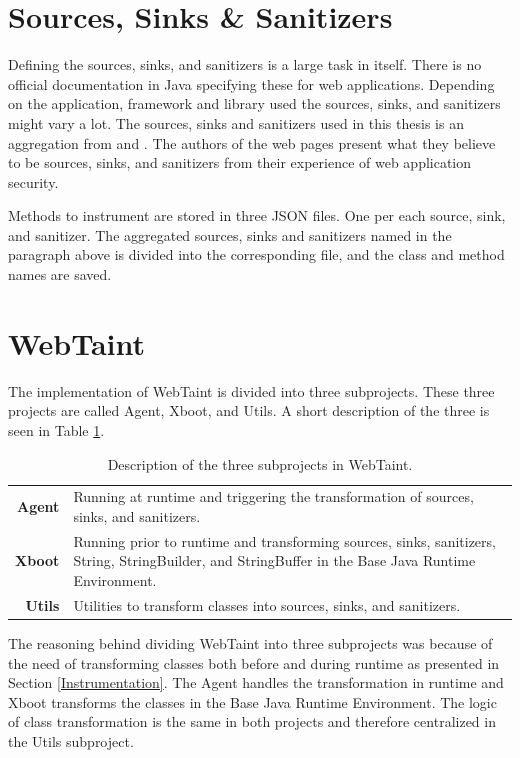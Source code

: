 \section{Sources, Sinks \& Sanitizers}
\label{souresSS}
Defining the sources, sinks, and sanitizers is a large task in itself. There is no official documentation in Java specifying these for web applications. Depending on the application, framework and library used the sources, sinks, and sanitizers might vary a lot. The sources, sinks and sanitizers used in this thesis is an aggregation from \textcite{sssCodeMaster} and \textcite{sssOWASP}. The authors of the web pages present what they believe to be sources, sinks, and sanitizers from their experience of web application security. 

Methods to instrument are stored in three JSON files. One per each source, sink, and sanitizer. The aggregated sources, sinks and sanitizers named in the paragraph above is divided into the corresponding file, and the class and method names are saved.



\section{WebTaint}
\label{SoftwareArchitecture}
The implementation of WebTaint is divided into three subprojects. These three projects are called Agent, Xboot, and Utils. A short description of the three is seen in Table \ref{table:subprojects}.

\begin{table}[H]
    \centering
    \caption{Description of the three subprojects in WebTaint.}
    \label{table:subprojects}
    \begin{tabular}{rp{10cm}}
        \textbf{Agent} & Running at runtime and triggering the transformation of sources, sinks, and sanitizers. \\
        \textbf{Xboot} & Running prior to runtime and transforming sources, sinks, sanitizers, String, StringBuilder, and StringBuffer in the Base Java Runtime Environment. \\
        \textbf{Utils} & Utilities to transform classes into sources, sinks, and sanitizers. \\
    \end{tabular}
\end{table}

The reasoning behind dividing WebTaint into three subprojects was because of the need of transforming classes both before and during runtime as presented in Section \ref{Instrumentation}. The Agent handles the transformation in runtime and Xboot transforms the classes in the Base Java Runtime Environment. The logic of class transformation is the same in both projects and therefore centralized in the Utils subproject.

